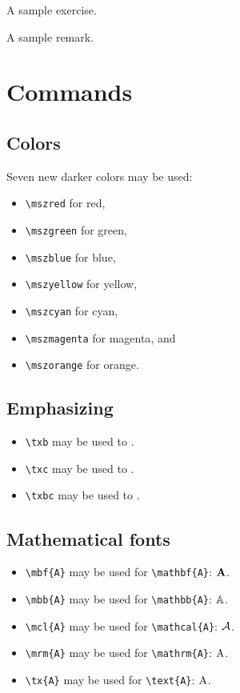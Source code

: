 \documentclass{mszreport}
\begin{document}
\begin{exercise}
    A sample exercise.
\end{exercise}

\begin{remark}
    A sample remark.
\end{remark}

\chapter{Commands}

\section{Colors}

Seven new darker colors may be used:
\begin{itemize}
    \item \verb|\mszred| for \textcolor{mszred}{red},
    \item \verb|\mszgreen| for \textcolor{mszgreen}{green},
    \item \verb|\mszblue| for \textcolor{mszblue}{blue},
    \item \verb|\mszyellow| for \textcolor{mszyellow}{yellow},
    \item \verb|\mszcyan| for \textcolor{mszcyan}{cyan},
    \item \verb|\mszmagenta| for \textcolor{mszmagenta}{magenta}, and
    \item \verb|\mszorange| for \textcolor{mszorange}{orange}.
\end{itemize}

\section{Emphasizing}

\begin{itemize}
    \item \verb|\txb| may be used to .
    \item \verb|\txc| may be used to .
    \item \verb|\txbc| may be used to .
\end{itemize}

\section{Mathematical fonts}

\begin{itemize}
    \item \verb|\mbf{A}| may be used for \verb|\mathbf{A}|: $\mathbf{A}$.
    \item \verb|\mbb{A}| may be used for \verb|\mathbb{A}|: $\mathbb{A}$.
    \item \verb|\mcl{A}| may be used for \verb|\mathcal{A}|: $\mathcal{A}$.
    \item \verb|\mrm{A}| may be used for \verb|\mathrm{A}|: $\mathrm{A}$.
    \item \verb|\tx{A}| may be used for \verb|\text{A}|: $\text{A}$.
\end{itemize}
\end{document}
